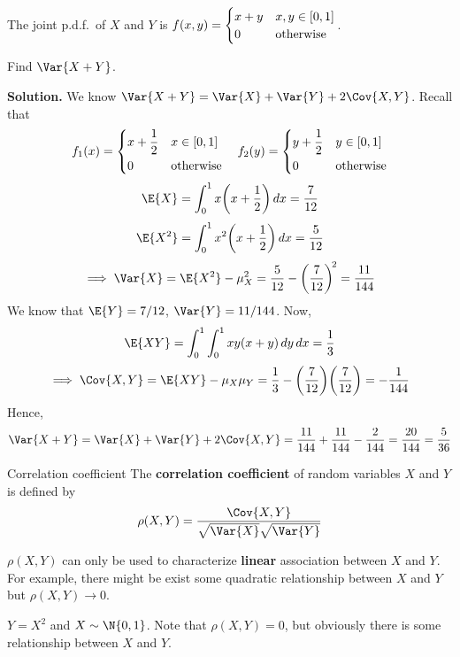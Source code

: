 \begin{Example}{}{}
    The joint p.d.f.\ of $ X $ and $ Y $ is
    $ f(x,y)=\begin{cases}
            x+y & x,y\in\interval{0}{1} \\
            0   & \text{otherwise}
        \end{cases} $.

    Find $ \Var{X+Y} $.

    \textbf{Solution.} We know $ \Var{X+Y}=\Var{X}+\Var{Y}+2\Cov{X,Y} $. Recall
    that
    \[ f_1(x)=\begin{dcases}
            x+\frac{1}{2} & x\in\interval{0}{1} \\
            0             & \text{otherwise}
        \end{dcases}\quad
        f_2(y)=\begin{dcases}
            y+\frac{1}{2} & y\in\interval{0}{1} \\
            0             & \text{otherwise}
        \end{dcases} \]
    \[ \E{X}=\int_{0}^{1} x\biggl( x+\frac{1}{2}  \biggr)\, d{x} =
        \frac{7}{12} \]
    \[ \E{X^2}=\int_{0}^{1} x^2\biggl( x+\frac{1}{2}  \biggr)\, d{x}=
        \frac{5}{12} \]
    \[ \implies\Var{X}=\E{X^2}-\mu_X^2=\frac{5}{12}-\biggl( \frac{7}{12} \biggr)^{\!2}=\frac{11}{144}  \]
    We know that $ \E{Y}=7/12 $, $ \Var{Y}=11/144 $. Now,
    \[ \E{XY}=
        \int_{0}^{1} \int_{0}^{1} x y(x+y)\, d{y}\, d{x}=\frac{1}{3}  \]
    \[ \implies \Cov{X,Y}=\E{XY}-\mu_X\mu_Y=
        \frac{1}{3} -\biggl( \frac{7}{12}  \biggr)\biggl( \frac{7}{12}  \biggr)=
        -\frac{1}{144}  \]
    Hence,
    \[ \Var{X+Y}=\Var{X}+\Var{Y}+2\Cov{X,Y}=
        \frac{11}{144} +\frac{11}{144} -\frac{2}{144} =\frac{20}{144}=\frac{5}{36} \]
\end{Example}
\begin{Definition}{Correlation coefficient}{}
    The \textbf{correlation coefficient} of
    random variables $ X $ and $ Y $ is defined by
    \[ \rho(X,Y)=\frac{\Cov{X,Y}}{\sqrt{\Var{X}}\sqrt{\Var{Y}}}  \]
\end{Definition}
\begin{Remark}{}{}
    $ \rho(X,Y) $ can only be used to characterize \textbf{linear} association
    between $ X $ and $ Y $. For example, there might be exist some quadratic
    relationship between $ X $ and $ Y $ but $ \rho(X,Y)\to 0 $.
\end{Remark}
\begin{Example}{}{}
    $ Y=X^2 $ and $ X \sim \N{0,1} $. Note that $ \rho(X,Y)=0 $,
    but obviously there is some relationship between $ X $ and $ Y $.
\end{Example}
